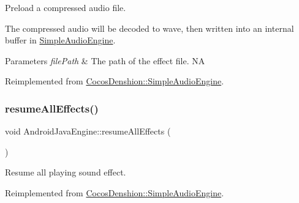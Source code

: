 Preload a compressed audio file.

The compressed audio will be decoded to wave, then written into an internal buffer in \hyperlink{classCocosDenshion_1_1SimpleAudioEngine}{Simple\+Audio\+Engine}.


\begin{DoxyParams}{Parameters}
{\em file\+Path} & The path of the effect file.  NA \\
\hline
\end{DoxyParams}


Reimplemented from \hyperlink{classCocosDenshion_1_1SimpleAudioEngine_ab4c7a383c668003d48094a3ed867a778}{Cocos\+Denshion\+::\+Simple\+Audio\+Engine}.

\mbox{\label{classCocosDenshion_1_1android_1_1AndroidJavaEngine_a52558e48db6fb0dd330d18c7f569aa85}} 
\subsubsection{\texorpdfstring{resume\+All\+Effects()}{resumeAllEffects()}\hspace{0.1cm}{\footnotesize\ttfamily [1/2]}}
{\footnotesize\ttfamily void Android\+Java\+Engine\+::resume\+All\+Effects (\begin{DoxyParamCaption}{ }\end{DoxyParamCaption})\hspace{0.3cm}{\ttfamily [virtual]}}

Resume all playing sound effect. 

Reimplemented from \hyperlink{classCocosDenshion_1_1SimpleAudioEngine_a502d7f9edde68126ebe1ecd9d29357e4}{Cocos\+Denshion\+::\+Simple\+Audio\+Engine}.

\mbox{\label{classCocosDenshion_1_1android_1_1AndroidJavaEngine_a168aac306a10c8c272636cdd1d816760}} 
